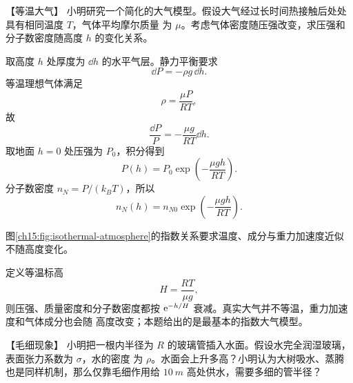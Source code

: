 {\begin{origexamplebox}{【等温大气】}\label{ch15:ex:s29-20-5}
小明研究一个简化的大气模型。假设大气经过长时间热接触后处处具有相同温度 $T$，气体平均摩尔质量
为 $\mu$。考虑气体密度随压强改变，求压强和分子数密度随高度 $h$ 的变化关系。

\ThQAtmosphere
\end{origexamplebox}\par\nopagebreak[4]

\par\nopagebreak[4]\begin{xesolution}
取高度 $h$ 处厚度为 $\dd h$ 的水平气层。静力平衡要求
\begin{equation*}
  \dd P=-\rho g\,\dd h.
\end{equation*}
等温理想气体满足
\begin{equation*}
  \rho=\frac{\mu P}{RT},
\end{equation*}
故
\begin{equation*}
  \frac{\dd P}{P}=-\frac{\mu g}{RT}\dd h.
\end{equation*}
取地面 $h=0$ 处压强为 $P_0$，积分得到
\begin{equation}
  \boxed{P(h)=P_0\exp\!\left(-\frac{\mu gh}{RT}\right)}.
\end{equation}
分子数密度 $n_N=P/(k_BT)$，所以
\begin{equation}
  \boxed{n_N(h)=n_{N0}\exp\!\left(-\frac{\mu gh}{RT}\right)}.
\end{equation}

\par\noindent\begin{minipage}{\linewidth}
\isothermalAtmosphereDiagram
{}\label{ch15:fig:isothermal-atmosphere}
\end{minipage}\par\medskip
图\ref{ch15:fig:isothermal-atmosphere}的指数关系要求温度、成分与重力加速度近似不随高度变化。

定义等温标高
\begin{equation*}
  \boxed{H=\frac{RT}{\mu g}},
\end{equation*}
则压强、质量密度和分子数密度都按 $\mathrm e^{-h/H}$ 衰减。真实大气并不等温，重力加速度和气体成分也会随
高度改变；本题给出的是最基本的指数大气模型。
\end{xesolution}


\begin{origexamplebox}{【毛细现象】}\label{ch15:ex:s29-20-6}
小明把一根内半径为 $R$ 的玻璃管插入水面。假设水完全润湿玻璃，表面张力系数为 $\sigma$，水的密度
为 $\rho$。水面会上升多高？小明认为大树吸水、蒸腾也是同样机制，那么仅靠毛细作用给
$\SI{10}{m}$ 高处供水，需要多细的管半径？


\end{origexamplebox}}
